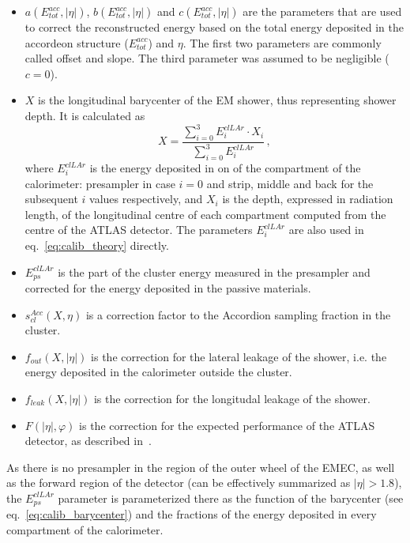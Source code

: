 \begin{itemize}
\item $a(E^{acc}_{tot}, |\eta|)$, $b (E^{acc}_{tot}, |\eta|)$ and $c (E^{acc}_{tot}, |\eta|)$ are the parameters that are used to correct the reconstructed energy based on the total energy deposited in the accordeon structure ($E^{acc}_{tot}$) and $\eta$. The first two parameters are commonly called offset and slope. The third parameter was assumed to be negligible ($c=0$).
\item $X$ is the longitudinal barycenter of the EM shower, thus representing shower depth. It is calculated as
\begin{equation}
\label{eq:calib_barycenter}
X = \frac{\sum\limits^{3}_{i=0}E^{clLAr}_{i} \cdot X_{i}}{\sum\limits^{3}_{i=0}E^{clLAr}_{i}} \,,
\end{equation}
where $E^{clLAr}_{i}$ is the energy deposited in on of the compartment of the calorimeter: presampler in case $i=0$ and strip, middle and back for the subsequent $i$ values respectively, and $X_{i}$ is the depth, expressed in radiation length, of the longitudinal centre of each compartment computed from the centre of the ATLAS detector. The parameters $E^{clLAr}_{i}$ are also used in eq.~\ref{eq:calib_theory} directly.
\item $E^{clLAr}_{ps}$ is the part of the cluster energy measured in the presampler and corrected for the energy deposited in the passive materials.
\item $s^{Acc}_{cl}(X,\eta)$ is a correction factor to the Accordion sampling fraction in the cluster.
\item $f_{out}(X,|\eta|)$ is the correction for the lateral leakage of the shower, i.e. the energy deposited in the calorimeter outside the cluster.
\item $f_{leak}(X,|\eta|)$ is the correction for the longitudal leakage of the shower.
\item $F(|\eta|,\varphi)$ is the correction for the expected performance of the ATLAS detector, as described in~\cite{lib:ATLAS_perf}.
\end{itemize}

As there is no presampler in the region of the outer wheel of the EMEC, as well as the forward region of the detector (can be effectively summarized as $|\eta|>1.8$), the $E^{clLAr}_{ps}$ parameter is parameterized there as the function of the barycenter (see eq.~\ref{eq:calib_barycenter}) and the fractions of the energy deposited in every compartment of the calorimeter.

